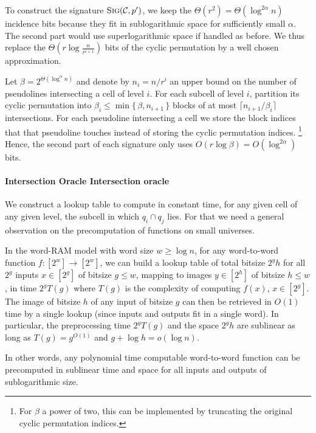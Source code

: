 To construct the signature \(\textsc{Sig}(\mathcal{C}, p')\),
we keep the \(\Theta(r^2) = \Theta(\log^{2\alpha} n)\) incidence bits because
they fit in sublogarithmic space for sufficiently small \(\alpha\).
The second part would use superlogarithmic space if handled as before.
We thus replace the \(\Theta(r \log{\frac{n}{r^{i+1}}})\) bits of the
cyclic permutation by a well chosen approximation.

Let \(\beta = 2^{\Theta(\log^{\alpha} n)}\) and denote by \(n_i = n/r^i\)
an upper bound on the number of pseudolines intersecting a cell of level \(i\). For
each subcell of level \(i\), partition its cyclic permutation into
\(\beta_i \leq \min \{\, \beta , n_{i+1} \,\} \) blocks
of at most \(\lceil n_{i+1} / \beta_i \rceil\) intersections.
%
For each pseudoline intersecting a cell we store the block indices that
that pseudoline touches instead of storing the cyclic permutation indices.%
\footnote{For \(\beta\) a power of two, this can be implemented by truncating
the original cyclic permutation indices.}
Hence, the second part
of each signature only uses \(O(r \log \beta) = O(\log^{2\alpha})\) bits.

\paragraph*{\iftitlecase%
Intersection Oracle\else%
Intersection oracle\fi}
We construct a lookup table to compute in constant time,
for any given cell of any given level, the subcell in which \(q_i \cap q_j\)
lies.
For that we need a general observation on the precomputation of functions on
small universes.
%
\begin{observation}\label{obs:small-universe-functions}
  In the word-RAM model with word size \(w \geq \log n\), for any word-to-word
  function \(f:[2^w] \to [2^w]\), we can build a lookup table of total bitsize
  \(2^g h\) for all \(2^g\) inputs \(x \in [2^g]\) of bitsize \(g \leq w\),
  mapping to images \(y \in [2^h]\) of bitsize \(h \leq w\),
  in time \(2^g T(g)\) where \(T(g)\) is the complexity of computing \(f(x)\), 
  \(x \in [2^g]\). The image of bitsize \(h\) of any input of bitsize \(g\) can then be
  retrieved in \(O(1)\) time by a single lookup (since inputs and outputs fit in
  a single word). In particular, the preprocessing time \(2^g T(g)\) and the
  space \(2^g h\) are sublinear as long as \(T(g)=g^{O(1)}\) and \(g + \log h
  = o(\log n)\).
\end{observation}
%
In other words, any polynomial time computable word-to-word function can be
precomputed in sublinear time and space for all inputs and outputs of
sublogarithmic size.
%

